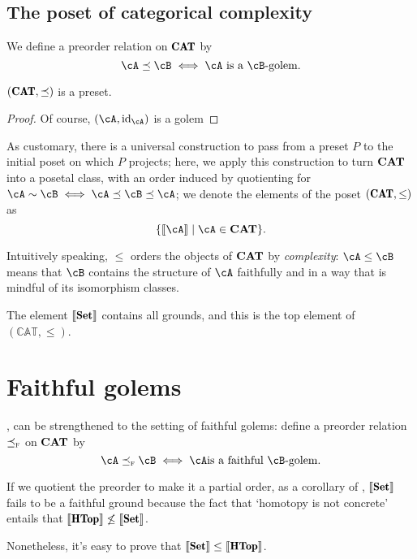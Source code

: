 \documentclass[a4paper,10pt,draft]{amsart}
\begin{document}
\subsection{The poset of categorical complexity}
\begin{definition}
We define a preorder relation on $\cate{CAT}$ by
\[
\cA \preceq \cB \iff \cA \text{ is a $\cB$-golem}. 
\]
\end{definition}
\begin{proposition}
$(\cate{CAT},\preceq)$ is a preset.
\end{proposition}
\begin{proof}
Of course, $(\cA, \id_{\cA})$ is a golem
\end{proof}
As customary, there is a universal construction to pass from a preset $P$ to the initial poset on which $P$ projects; here, we apply this construction to turn $\bf CAT$ into a posetal class, with an order induced by quotienting for $\cA \sim \cB \iff \cA \preceq \cB \preceq \cA$; we denote the elements of the poset $(\cate{CAT},\le)$ as 
\[
\{\eqc{\cA} \mid \cA \in\bf CAT\}.
\] 
\begin{remark}
Intuitively speaking, $\le$ orders the objects of $\bf CAT$ by \emph{complexity}: $\cA \le \cB$ means that $\cB$ contains the structure of $\cA$ faithfully and in a way that is mindful of its isomorphism classes.
\end{remark}
\begin{remark}
The element $\eqc{\Set}$ contains all grounds, and this is the top element of $(\mathbb{CAT},\le)$.
\end{remark}
\section{Faithful golems}
\adef{},  can be strengthened to the setting of faithful golems: define a preorder relation $\preceq_\textsc{f}$ on $\bf CAT$ by
\[
\cA \preceq_\textsc{f} \cB \iff \cA \text{is a faithful $\cB$-golem} .
\]
\begin{remark}
If we quotient the preorder to make it a partial order, as a corollary of \cite{Freydconc}, $\eqc{\Set}$ fails to be a faithful ground because the fact that `homotopy is not concrete' entails that $\eqc{\cate{HTop}} \not\le \eqc{\Set}$. 

Nonetheless, it's easy to prove that $\eqc{\Set} \le \eqc{\cate{HTop}}$.
\end{remark}

\end{document}

